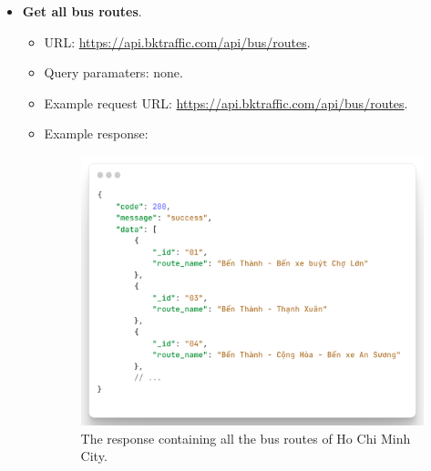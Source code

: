 \begin{itemize}
    \item \textbf{Get all bus routes}.
    \begin{itemize}
        \item URL: \url{https://api.bktraffic.com/api/bus/routes}.
        \item Query paramaters: none.
        \item Example request URL: \url{https://api.bktraffic.com/api/bus/routes}.
        \item Example response:
        \begin{figure}[H]
            \includegraphics[width=\textwidth]{assets/images/Implementation/all_routes_response.png}
            \caption{The response containing all the bus routes of Ho Chi Minh City.}
            \label{fig:all_routes_response}
        \end{figure}
    \end{itemize}


\end{itemize}

